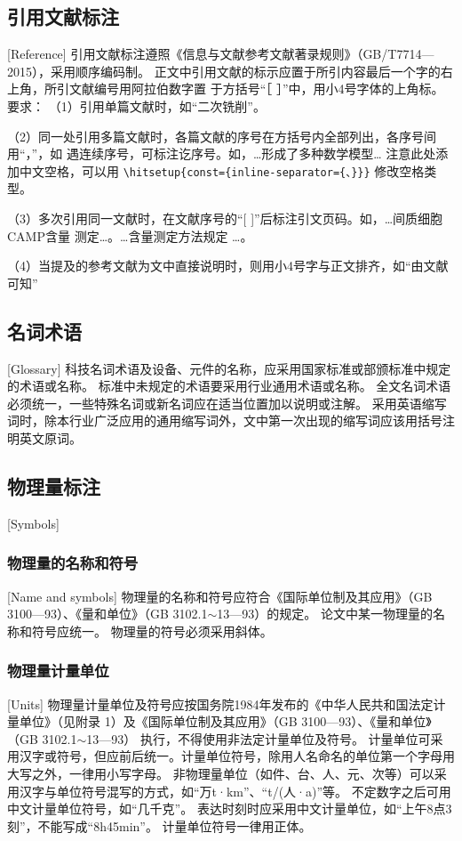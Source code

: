 \subsection{引用文献标注}[Reference]
引用文献标注遵照《信息与文献参考文献著录规则》（GB/T7714—2015），采用顺序编码制。
正文中引用文献的标示应置于所引内容最后一个字的右上角，所引文献编号用阿拉伯数字置
于方括号“［ ］”中，用小4号字体的上角标。
要求：
（1）引用单篇文献时，如“二次铣削\cite{cnproceed}”。

（2）同一处引用多篇文献时，各篇文献的序号在方括号内全部列出，各序号间用“，”，如
遇连续序号，可标注讫序号。如，…形成了多种数学模型\cite{cnarticle,cnproceed}…
注意此处添加中文空格，可以用 \verb|\hitsetup{const={inline-separator={、}}}| 修改空格类型。

（3）多次引用同一文献时，在文献序号的“[ ]”后标注引文页码。如，…间质细胞CAMP含量
测定\cite[100-197]{cnarticle}…。…含量测定方法规定
\cite[92]{cnarticle}…。

（4）当提及的参考文献为文中直接说明时，则用小4号字与正文排齐，如“由文献可知”

\subsection{名词术语}[Glossary]
科技名词术语及设备、元件的名称，应采用国家标准或部颁标准中规定的术语或名称。
标准中未规定的术语要采用行业通用术语或名称。
全文名词术语必须统一，一些特殊名词或新名词应在适当位置加以说明或注解。
采用英语缩写词时，除本行业广泛应用的通用缩写词外，文中第一次出现的缩写词应该用括号注明英文原词。

\subsection{物理量标注}[Symbols]
\subsubsection{物理量的名称和符号}[Name and symbols]
物理量的名称和符号应符合《国际单位制及其应用》（GB 3100—93）、《量和单位》（GB
3102.1$\sim$13—93）的规定。
论文中某一物理量的名称和符号应统一。
物理量的符号必须采用斜体。

\subsubsection{物理量计量单位}[Units]
物理量计量单位及符号应按国务院1984年发布的《中华人民共和国法定计量单位》（见附录
1）及《国际单位制及其应用》（GB 3100—93）、《量和单位》（GB 3102.1$\sim$13—93）
执行，不得使用非法定计量单位及符号。
计量单位可采用汉字或符号，但应前后统一。计量单位符号，除用人名命名的单位第一个字母用大写之外，一律用小写字母。
非物理量单位（如件、台、人、元、次等）可以采用汉字与单位符号混写的方式，如“万t·km”、“t/(人·a)”等。
不定数字之后可用中文计量单位符号，如“几千克”。
表达时刻时应采用中文计量单位，如“上午8点3刻”，不能写成“8h45min”。
计量单位符号一律用正体。

